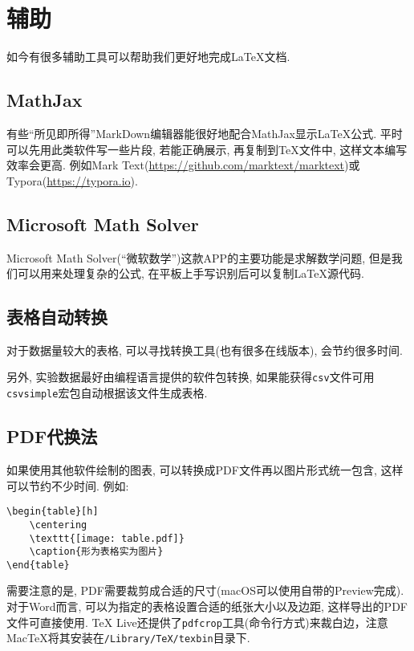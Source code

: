 \chapter{辅助}

如今有很多辅助工具可以帮助我们更好地完成\LaTeX{}文档.

\section{MathJax}

有些``所见即所得''MarkDown编辑器能很好地配合MathJax显示\LaTeX{}公式.
平时可以先用此类软件写一些片段, 若能正确展示, 再复制到\TeX{}文件中, 这样文本编写效率会更高.
例如Mark Text(\url{https://github.com/marktext/marktext})或Typora(\url{https://typora.io}).

\section{Microsoft Math Solver}

Microsoft Math Solver(``微软数学'')这款APP的主要功能是求解数学问题, 但是我们可以用来处理复杂的公式, 在平板上手写识别后可以复制\LaTeX{}源代码.

\section{表格自动转换}

对于数据量较大的表格, 可以寻找转换工具(也有很多在线版本), 会节约很多时间.

另外, 实验数据最好由编程语言提供的软件包转换, 如果能获得\texttt{csv}文件可用\texttt{csvsimple}宏包自动根据该文件生成表格.

\section{PDF代换法}

如果使用其他软件绘制的图表, 可以转换成PDF文件再以图片形式统一包含, 这样可以节约不少时间.
例如:
\begin{Verbatim}
\begin{table}[h]
    \centering
    \texttt{[image: table.pdf]}
    \caption{形为表格实为图片}
\end{table}
\end{Verbatim}
需要注意的是, PDF需要裁剪成合适的尺寸(macOS可以使用自带的Preview完成).
对于Word而言, 可以为指定的表格设置合适的纸张大小以及边距, 这样导出的PDF文件可直接使用.
TeX Live还提供了\texttt{pdfcrop}工具(命令行方式)来裁白边，注意MacTeX将其安装在\texttt{/Library/TeX/texbin}目录下.
